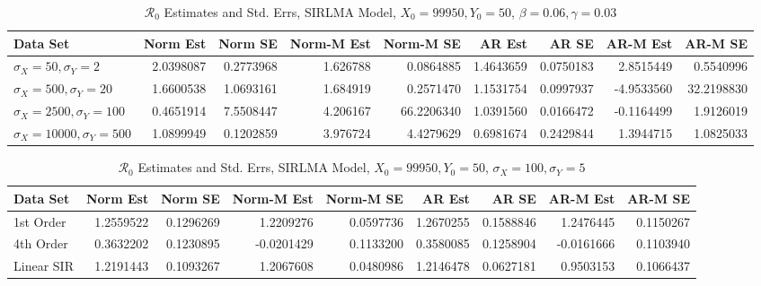 \documentclass[12pt]{article}
\newcommand{\rr}{\ensuremath{\mathcal{R}_0}}
\begin{document}
\begin{table}[H]
	
	\caption{\label{tab:}$\rr$ Estimates and Std. Errs, SIRLMA Model,
		$X_0 = 99950, Y_0 = 50$, $\beta = 0.06, \gamma = 0.03$}
	\centering
	\begin{footnotesize}
		\begin{tabular}[t]{l|r|r|r|r|r|r|r|r}
			\hline
			Data Set & Norm Est & Norm SE & Norm-M Est & Norm-M SE & AR Est & AR SE & AR-M Est & AR-M SE\\
			\hline
			$\sigma_X = 50, \sigma_Y = 2$ & 2.0398087 & 0.2773968 & 1.626788 & 0.0864885 & 1.4643659 & 0.0750183 & 2.8515449 & 0.5540996\\
			\hline
			$\sigma_X = 500, \sigma_Y = 20$ & 1.6600538 & 1.0693161 & 1.684919 & 0.2571470 & 1.1531754 & 0.0997937 & -4.9533560 & 32.2198830\\
			\hline
			$\sigma_X = 2500, \sigma_Y = 100$ & 0.4651914 & 7.5508447 & 4.206167 & 66.2206340 & 1.0391560 & 0.0166472 & -0.1164499 & 1.9126019\\
			\hline
			$\sigma_X = 10000, \sigma_Y = 500$ & 1.0899949 & 0.1202859 & 3.976724 & 4.4279629 & 0.6981674 & 0.2429844 & 1.3944715 & 1.0825033\\
			\hline
		\end{tabular}
	\end{footnotesize}
\end{table}

\begin{table}[H]
	
	\caption{\label{tab:}$\rr$ Estimates and Std. Errs, SIRLMA Model,
		$X_0 = 99950, Y_0 = 50$, $\sigma_X = 100, \sigma_Y = 5$}
	\centering
	\begin{footnotesize}
		\begin{tabular}[t]{l|r|r|r|r|r|r|r|r}
			\hline
			Data Set & Norm Est & Norm SE & Norm-M Est & Norm-M SE & AR Est & AR SE & AR-M Est & AR-M SE\\
			\hline
			1st Order & 1.2559522 & 0.1296269 & 1.2209276 & 0.0597736 & 1.2670255 & 0.1588846 & 1.2476445 & 0.1150267\\
			\hline
			4th Order & 0.3632202 & 0.1230895 & -0.0201429 & 0.1133200 & 0.3580085 & 0.1258904 & -0.0161666 & 0.1103940\\
			\hline
			Linear SIR & 1.2191443 & 0.1093267 & 1.2067608 & 0.0480986 & 1.2146478 & 0.0627181 & 0.9503153 & 0.1066437\\
			\hline
		\end{tabular}
	\end{footnotesize}
\end{table}
\end{document}
